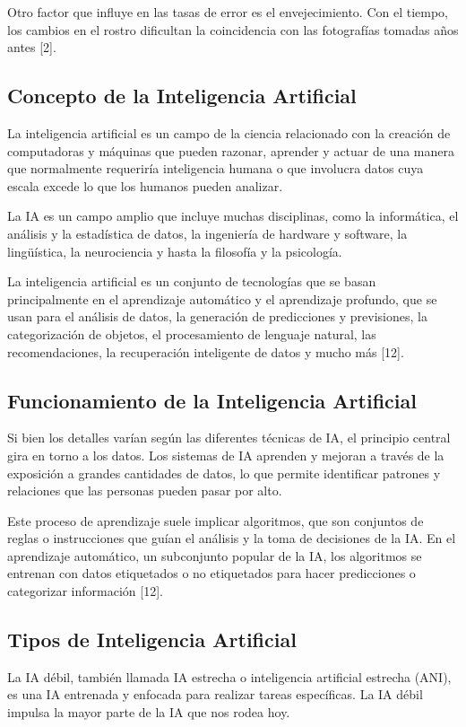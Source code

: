 Otro factor que influye en las tasas de error es el envejecimiento. Con el
tiempo, los cambios en el rostro dificultan la coincidencia con las fotografías
tomadas años antes [2].


\subsection{Concepto de la Inteligencia Artificial}

La inteligencia artificial es un campo de la ciencia relacionado con la creación de computadoras y máquinas que pueden razonar, aprender y actuar de una manera que normalmente requeriría inteligencia humana o que involucra datos cuya escala excede lo que los humanos pueden analizar.

La IA es un campo amplio que incluye muchas disciplinas, como la informática, el análisis y la estadística de datos, la ingeniería de hardware y software, la lingüística, la neurociencia y hasta la filosofía y la psicología.

La inteligencia artificial es un conjunto de tecnologías que se basan principalmente en el aprendizaje automático y el aprendizaje profundo, que se usan para el análisis de datos, la generación de predicciones y previsiones, la categorización de objetos, el procesamiento de lenguaje natural, las recomendaciones, la recuperación inteligente de datos y mucho más [12].


\subsection{Funcionamiento de la Inteligencia Artificial}

Si bien los detalles varían según las diferentes técnicas de IA, el principio central gira en torno a los datos. Los sistemas de IA aprenden y mejoran a través de la exposición a grandes cantidades de datos, lo que permite identificar patrones y relaciones que las personas pueden pasar por alto.

Este proceso de aprendizaje suele implicar algoritmos, que son conjuntos de reglas o instrucciones que guían el análisis y la toma de decisiones de la IA. En el aprendizaje automático, un subconjunto popular de la IA, los algoritmos se entrenan con datos etiquetados o no etiquetados para hacer predicciones o categorizar información [12].


\subsection{Tipos de Inteligencia Artificial}
La IA débil, también llamada IA estrecha o inteligencia artificial estrecha (ANI), es una IA entrenada y enfocada para realizar tareas específicas. La IA débil impulsa la mayor parte de la IA que nos rodea hoy.

